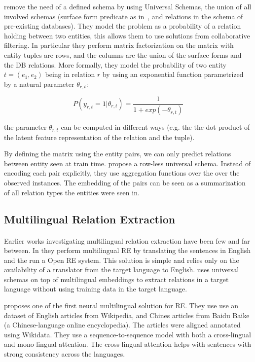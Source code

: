 \cite{riedel2013relation} remove the need of a defined schema by using Universal Schemas, the union of all involved schemas (surface form predicate as in~\citep{banko2007openre}, and relations in the schema of pre-existing databases). They model the problem as a probability of a relation holding between two entities, this allows them to use solutions from collaborative filtering. In particular they perform matrix factorization on the matrix with entity tuples are rows, and the columns are the union of the surface forms and the DB relations. More formally, they model the probability of two entity $t = (e_1, e_2)$ being in relation $r$ by using an exponential function parametrized by a natural parameter $\theta_{r, t}$:

\begin{equation}
    P(y_{r, t} = 1 | \theta_{r, t}) = \frac{1}{1+exp(-\theta_{r,t})}
\end{equation}

the parameter $\theta_{r,t}$ can be computed in different ways (e.g. the the dot product of the latent feature representation of the relation and the tuple).

By defining the matrix using the entity pairs, we can only predict relations between entity seen at train time. \cite{verga-mccallum-2016-row} propose a row-less universal schema. Instead of encoding each pair explicitly, they use aggregation functions over the over the observed instances. The embedding of the pairs can be seen as a summarization of all relation types the entities were seen in.

\subsection{Multilingual Relation Extraction}
\paragraph{}
Earlier works investigating multilingual relation extraction have been few and far between. In \cite{faruqui2015multilingual} they perform multilingual RE by translating the sentences in English and the run a Open RE system. This solution is simple and relies only on the availability of a translator from the target language to English. \cite{verga2015multilingual} uses universal schemas on top of multilingual embeddings to extract relations in a target language without  using  training  data in the target language. 

\cite{lin-etal-2017-neural} proposes one of the first neural multilingual solution for RE. They use use an dataset of English articles from Wikipedia, and Chines articles from Baidu Baike (a Chinese-language online encyclopedia). The articles were aligned annotated using Wikidata. They use a sequence-to-sequence model with both a cross-lingual and mono-lingual attention. The cross-lingual attention helps with sentences with strong consistency across the languages.   

